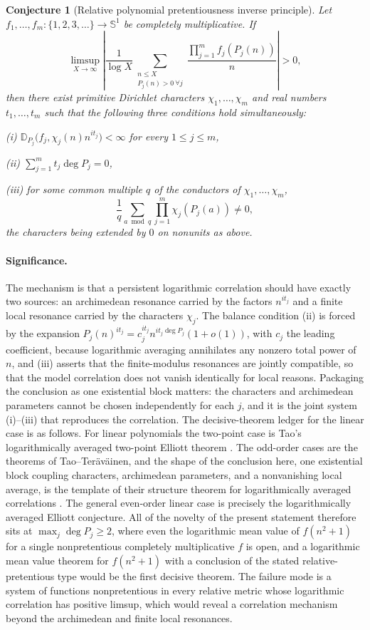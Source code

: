 \documentclass[11pt]{article}
\newtheorem{conjecture}{Conjecture}
\theoremstyle{definition}
\begin{document}
\begin{conjecture}[Relative polynomial pretentiousness inverse principle]\label{t1}
Let $f_1,\ldots,f_m:\{1,2,3,\ldots\}\to\mathbb S^1$ be completely
multiplicative.  If
\[
\limsup_{X\to\infty}
\left|
\frac{1}{\log X}
\sum_{\substack{n\le X\\P_j(n)>0\ \forall j}}
\frac{\prod_{j=1}^m f_j(P_j(n))}{n}
\right|>0,
\]
then there exist primitive Dirichlet characters
$\chi_1,\ldots,\chi_m$ and real numbers $t_1,\ldots,t_m$ such that
the following three conditions hold simultaneously:

\emph{(i)} $\mathbb D_{P_j}\bigl(f_j,\chi_j(n)n^{it_j}\bigr)<\infty$
for every $1\le j\le m$,

\emph{(ii)} $\displaystyle\sum_{j=1}^m t_j\deg P_j=0$,

\emph{(iii)} for some common multiple $q$ of the conductors of
$\chi_1,\ldots,\chi_m$,
\[
\frac1q\sum_{a\bmod q}\prod_{j=1}^m\chi_j(P_j(a))\ne0,
\]
the characters being extended by $0$ on nonunits as above.

\end{conjecture}

\paragraph{Significance.}
The mechanism is that a persistent logarithmic correlation should have
exactly two sources: an archimedean resonance carried by the factors
$n^{it_j}$ and a finite local resonance carried by the characters
$\chi_j$.  The balance condition (ii) is forced by the expansion
$P_j(n)^{it_j}=c_j^{it_j}n^{it_j\deg P_j}(1+o(1))$, with $c_j$ the
leading coefficient, because logarithmic averaging annihilates any
nonzero total power of $n$, and (iii) asserts that the finite-modulus
resonances are jointly compatible, so that the model correlation does
not vanish identically for local reasons.  Packaging the conclusion as
one existential block matters: the characters and archimedean
parameters cannot be chosen independently for each $j$, and it is the
joint system (i)--(iii) that reproduces the correlation.  The
decisive-theorem ledger for the linear case is as follows.  For linear
polynomials the two-point case is Tao's logarithmically averaged
two-point Elliott theorem \cite{Tao16}.  The odd-order cases are the
theorems of Tao--Ter\"av\"ainen, and the shape of the conclusion here,
one existential block coupling characters, archimedean parameters, and
a nonvanishing local average, is the template of their structure
theorem for logarithmically averaged correlations
\cite{TT19}.  The general even-order linear case is
precisely the logarithmically averaged Elliott conjecture.  All of the
novelty of the present statement therefore sits at
$\max_j\deg P_j\ge2$, where even the logarithmic mean value of
$f(n^2+1)$ for a single nonpretentious completely multiplicative $f$
is open, and a logarithmic mean value theorem for $f(n^2+1)$ with a
conclusion of the stated relative-pretentious type would be the first
decisive theorem.  The failure mode is a system of functions
nonpretentious in every relative metric whose logarithmic correlation
has positive limsup, which would reveal a correlation mechanism beyond
the archimedean and finite local resonances.
\end{document}
